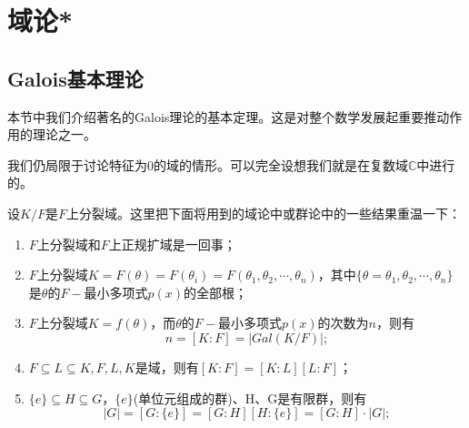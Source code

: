 \section{域论*}
\subsection{Galois基本理论}
\original
{
	本节中我们介绍著名的Galois理论的基本定理。这是对整个数学发展起重要推动作用的理论之一。
	\par
	我们仍局限于讨论特征为0的域的情形。可以完全设想我们就是在复数域$\mathbb{C}$中进行的。
	\par
	设$K/F$是$F$上分裂域。这里把下面将用到的域论中或群论中的一些结果重温一下：
	\begin{enumerate}
		\item $F$上分裂域和$F$上正规扩域是一回事；
		\item $F$上分裂域$K=F(\theta)=F(\theta_{i})=F(\theta_{1},\theta_{2},\cdots,\theta_{n})$，其中$\{\theta=\theta_{1},\theta_{2},\cdots,\theta_{n}\}$是$\theta$的$F-$最小多项式$p(x)$的全部根；
		\item $F$上分裂域$K=f(\theta)$，而$\theta$的$F-$最小多项式$p(x)$的次数为$n$，则有
		\begin{equation*}
			n=[K:F]=|Gal(K/F)|;
		\end{equation*}
		\item $F\subseteq L \subseteq K,F,L,K$是域，则有$[K:F]=[K:L][L:F]$；
		\item $\{e\}\subseteq H\subseteq G$，$\{e\}$(单位元组成的群)、H、G是有限群，则有
		\begin{equation*}
			|G|=[G:\{e\}]=[G:H][H:\{e\}]=[G:H]\cdot|G|;
		\end{equation*}
	

\end{enumerate}}
